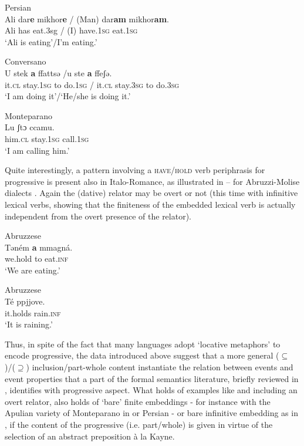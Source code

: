 \documentclass[output=paper,modfonts,nonflat,newtxmath,colorlinks,citecolor=brown]{langsci/langscibook}
\begin{document}
\ea Persian\\%
    \label{ex:franco:15}
    \gll Ali dar\textbf{e} mikhor\textbf{e} / (Man) dar\textbf{am} mikhor\textbf{am}. \\
        Ali has eat.3sg / (I) have.\textsc{1sg} eat.\textsc{1sg}\\
    \glt ‘Ali is eating’/I’m eating.’
    \z


\ea Conversano\\ %
    \label{ex:franco:16}
    \gll U stek   \textbf{a}   ffattsə /u   ste   \textbf{a}  ffeʃə.\\
        it.\textsc{cl}   stay.\textsc{1sg} to   do.\textsc{1sg} / it.\textsc{cl}   stay.\textsc{3sg}   to do.3\textsc{sg}\\
    \glt ‘I am doing it’/‘He/she is doing it.’
    \z

\ea Monteparano\\ %
    \label{ex:franco:17}
    \gll Lu   ʃtɔ   ccamu.  \\
        him.\textsc{cl} stay.\textsc{1sg}   call.\textsc{1sg} \\
    \glt ‘I am calling him.’
    \z



Quite interestingly, a pattern involving a \textsc{have/hold} verb periphrasis for progressive is present also in Italo-Romance, as illustrated in -- for Abruzzi-Molise dialects \citep[555]{Cinque2017}. Again the (dative) relator may be overt  or not  (this time with infinitive lexical verbs, showing that the finiteness of the embedded lexical verb is actually independent from the overt presence of the relator).

\ea Abruzzese\\%
    \label{ex:franco:18}
    \gll Təném \textbf{a} mmagná.\\
        we.hold to eat.\textsc{inf}\\
    \glt ‘We are eating.’  \citep[133]{Rohlfs1969}

    \z

\ea Abruzzese\\%
    \label{ex:franco:19}
    \gll Té ppjjove.    \\
        it.holds rain.\textsc{inf}\\
    \glt ‘It is raining.’ \citep[266]{Ledgeway2016}
    \z

Thus, in spite of the fact that many languages adopt ‘locative metaphors’ to encode progressive, the data introduced above suggest that a more general (${\subseteq}$)/(${\supseteq}$) inclusion/part-whole content instantiate the relation between events and event properties that a part of the formal semantics literature, briefly reviewed in , identifies with progressive aspect.\textsuperscript{} What holds of examples like  and  including an overt relator, also holds of ‘bare’ finite embeddings - for instance with the Apulian variety of Monteparano in  or Persian  - or bare infinitive embedding as in , if the content of the progressive (i.e. part/whole) is given in virtue of the selection of an abstract preposition {à la} Kayne.
\end{document}
